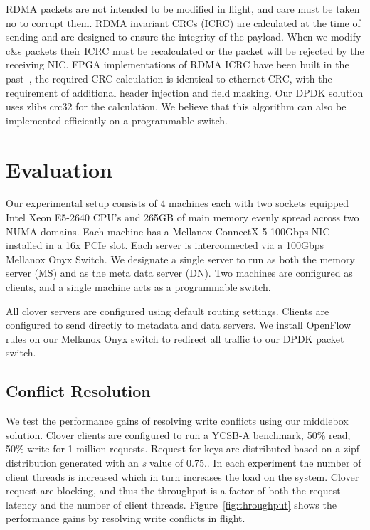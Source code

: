RDMA packets are not intended to be modified in flight, and care must
be taken no to corrupt them. RDMA invariant CRCs (ICRC) are calculated
at the time of sending and are designed to ensure the integrity of the
payload. When we modify c\&s packets their ICRC must be recalculated or
the packet will be rejected by the receiving NIC. FPGA implementations
of RDMA ICRC have been built in the past~\cite{Mansour_2019}, the
required CRC calculation is identical to ethernet CRC, with the
requirement of additional header injection and field masking. Our DPDK
solution uses zlibs crc32 for the calculation. We believe that this
algorithm can also be implemented efficiently on a programmable
switch.

\section{Evaluation}

Our experimental setup consists of 4 machines each with two sockets
equipped Intel Xeon E5-2640 CPU's and 265GB of main memory evenly
spread across two NUMA domains. Each machine has a Mellanox ConnectX-5
100Gbps NIC installed in a 16x PCIe slot. Each server is
interconnected via a 100Gbps Mellanox Onyx Switch. We designate a
single server to run as both the memory server (MS) and as the meta
data server (DN). Two machines are configured as clients, and a single
machine acts as a programmable switch.

All clover servers are configured using default routing settings.
Clients are configured to send directly to metadata and data servers.
We install OpenFlow rules on our Mellanox Onyx switch to redirect all
traffic to our DPDK packet switch.

\subsection{Conflict Resolution}

We test the performance gains of resolving write conflicts using our
middlebox solution. Clover clients are configured to run a YCSB-A
benchmark, 50\% read, 50\% write for 1 million requests. Request for
keys are distributed based on a zipf distribution generated with an
\textit{s} value of 0.75.. In each
experiment the number of client threads is increased which in turn
increases the load on the system. Clover request are blocking, and
thus the throughput is a factor of both the request latency and the
number of client threads. Figure~\ref{fig:throughput} shows the
performance gains by resolving write conflicts in flight.

